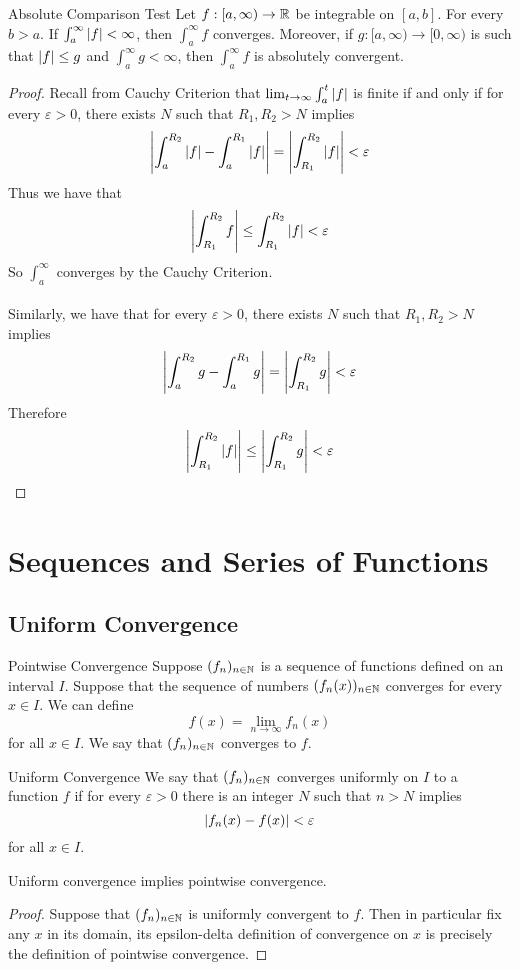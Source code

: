 \documentclass[a4paper]{article}
\begin{document}
\begin{thm}{Absolute Comparison Test}{} Let $f:[a,\infty)\to\mathbb{R}$ be integrable on $[a,b]$. For every $b>a$. If $\int_a^\infty\abs{f}<\infty$, then $\int_a^\infty f$ converges. Moreover, if $g:[a,\infty)\to[0,\infty)$ is such that $\abs{f}\leq g$ and $\int_a^\infty g<\infty$, then $\int_a^\infty f$ is absolutely convergent. \tcbline
\begin{proof} Recall from Cauchy Criterion that $\lim_{t\to\infty}\int_a^t\abs{f}$ is finite if and only if for every $\varepsilon>0$, there exists $N$ such that $R_1,R_2>N$ implies $$\abs{\int_a^{R_2}\abs{f}-\int_a^{R_1}\abs{f}}=\abs{\int_{R_1}^{R_2}\abs{f}}<\varepsilon$$ Thus we have that $$\abs{\int_{R_1}^{R_2}f}\leq\int_{R_1}^{R_2}\abs{f}<\varepsilon$$ So $\int_a^\infty$ converges by the Cauchy Criterion. \\~\\
Similarly, we have that for every $\varepsilon>0$, there exists $N$ such that $R_1,R_2>N$ implies $$\abs{\int_a^{R_2}g-\int_a^{R_1}g}=\abs{\int_{R_1}^{R_2}g}<\varepsilon$$ Therefore $$\abs{\int_{R_1}^{R_2}\abs{f}}\leq\abs{\int_{R_1}^{R_2}g}<\varepsilon$$
\end{proof}
\end{thm}

\pagebreak
\section{Sequences and Series of Functions}
\subsection{Uniform Convergence}
\begin{defn}{Pointwise Convergence}{} Suppose $(f_n)_{n\in\mathbb{N}}$ is a sequence of functions defined on an interval $I$. Suppose that the sequence of numbers $(f_n(x))_{n\in\mathbb{N}}$ converges for every $x\in I$. We can define $$f(x)=\lim_{n\to\infty}f_n(x)$$ for all $x\in I$. We say that $(f_n)_{n\in\mathbb{N}}$ converges to $f$. 
\end{defn}

\begin{defn}{Uniform Convergence}{} We say that $(f_n)_{n\in\mathbb{N}}$ converges uniformly on $I$ to a function $f$ if for every $\varepsilon>0$ there is an integer $N$ such that $n>N$ implies $$\abs{f_n(x)-f(x)}<\varepsilon$$ for all $x\in I$. 
\end{defn}

\begin{crl}{}{} Uniform convergence implies pointwise convergence. \tcbline
\begin{proof} Suppose that $(f_n)_{n\in\mathbb{N}}$ is uniformly convergent to $f$. Then in particular fix any $x$ in its domain, its epsilon-delta definition of convergence on $x$ is precisely the definition of pointwise convergence. 
\end{proof}
\end{crl}
\end{document}
